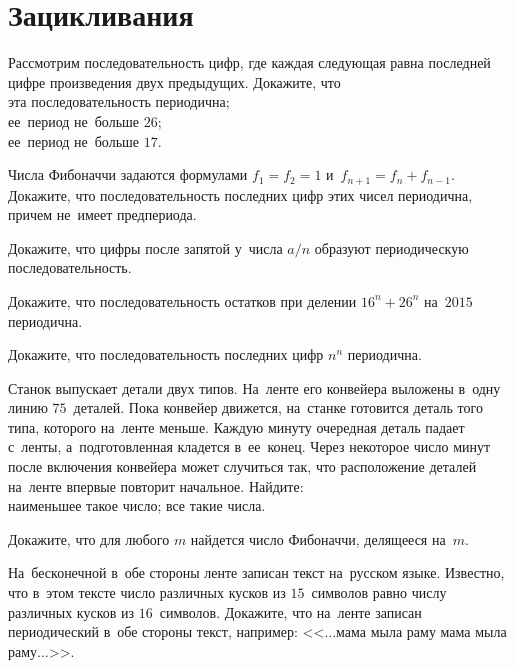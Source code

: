 
\section*{Зацикливания}


\begin{problems}

\item
Рассмотрим последовательность цифр, где каждая следующая равна последней цифре
произведения двух предыдущих.
Докажите, что
\\
\subproblem эта последовательность периодична;
\\
\subproblem ее~период не~больше $26$;
\\
\subproblem ее~период не~больше $17$.

\item
Числа Фибоначчи задаются формулами
$f_1 = f_2 = 1$ и~$f_{n + 1} = f_n + f_{n - 1}$.
Докажите, что последовательность последних цифр этих чисел периодична, причем
не~имеет предпериода.

\item
Докажите, что цифры после запятой у~числа $a / n$ образуют периодическую
последовательность.

\item
Докажите, что последовательность остатков при делении $16^n + 26^n$ на~$2015$
периодична.

\item
Докажите, что последовательность последних цифр $n^n$ периодична.

\item
Станок выпускает детали двух типов.
На~ленте его конвейера выложены в~одну линию $75$~деталей.
Пока конвейер движется, на~станке готовится деталь того типа, которого на~ленте
меньше.
Каждую минуту очередная деталь падает с~ленты, а~подготовленная кладется
в~ее~конец.
Через некоторое число минут после включения конвейера может случиться так, что
расположение деталей на~ленте впервые повторит начальное.
Найдите:
\\
\subproblem наименьшее такое число;
\quad
\subproblem все такие числа.

\item
Докажите, что для любого $m$ найдется число Фибоначчи, делящееся на~$m$.

\item
На~бесконечной в~обе стороны ленте записан текст на~русском языке.
Известно, что в~этом тексте число различных кусков из $15$~символов равно числу
различных кусков из $16$~символов.
Докажите, что на~ленте записан периодический в~обе стороны текст, например:
<<...мама мыла раму мама мыла раму...>>.


\end{problems}
